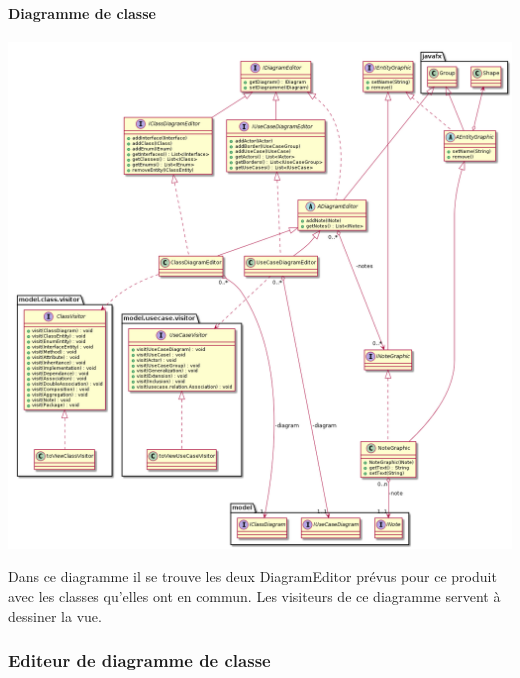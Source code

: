 \documentclass[a4paper,10pt]{article}
\begin{document}
	\paragraph{Diagramme de classe}
	\begin{center}
	    \includegraphics[width=\textwidth]{Image/DiagramEditorGeneral.png}
	\end{center}
	Dans ce diagramme il se trouve les deux DiagramEditor prévus pour ce produit avec les classes qu'elles ont en commun.
	Les visiteurs de ce diagramme servent à dessiner la vue.
	
	\newpage
    \subsubsection{Editeur de diagramme de classe}
\end{document}
